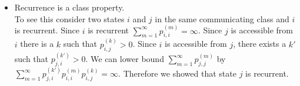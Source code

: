 \begin{itemize}
%
%
%
%
%


\item Recurrence is a class property.\\
To see this consider two states $i$ and $j$ in the same communicating class and $i$ is recurrent. Since $i$ is recurrent
$\sum\nolimits_{m = 1}^\infty {p_{i,i}^{(m)}}  = \infty $. Since $j$
is accessible from $i$ there is a $k$ such that $p_{i,j}^{(k)}
>0$. Since $i$ is accessible from $j$, there exists a $k'$ such that
$p_{j,i}^{(k')}>0$. We can lower bound $\sum\nolimits_{m = 1}^\infty
{p_{j,j}^{(m)}}$ by $\sum_{m = 1}^\infty
{p_{j,i}^{(k')}}{p_{i,i}^{(m)}} {p_{i,j}^{(k)}} = \infty $.
Therefore we showed that state $j$ is recurrent.



\end{itemize}
